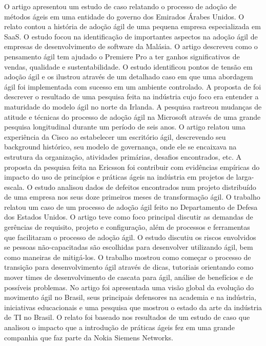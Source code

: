 O artigo \cite{Hajjdiab2011} apresentou um estudo de caso relatando o processo de adoção de métodos ágeis em uma entidade do governo dos Emirados Árabes Unidos. O relato \cite{Block2011} contou a história de adoção ágil de uma pequena empresa especializada em SaaS. O estudo \cite{Asnawi2012} focou na identificação de importantes aspectos na adoção ágil de empresas de desenvolvimento de software da Malásia. O artigo \cite{Adobe2012} descreveu como o pensamento ágil tem ajudado o Premiere Pro a ter ganhos significativos de vendas, qualidade e sustentabilidade. O estudo \cite{Fitzgerald2013} identificou pontos de tensão em adoção ágil e os ilustrou através de um detalhado caso em que uma abordagem ágil foi implementada com sucesso em um ambiente controlado. A proposta de \cite{Bustard2013} foi descrever o resultado de uma pesquisa feita na indústria cujo foco era entender a maturidade do modelo ágil no norte da Irlanda. A pesquisa \cite{Microsoft2013} rastreou mudanças de atitude e técnicas do processo de adoção ágil na Microsoft através de uma grande pesquisa longitudinal durante um período de seis anos. O artigo \cite{Cisco2011} relatou uma experiência da Cisco ao estabelecer um escritório ágil, descrevendo seu background histórico, seu modelo de governança, onde ele se encaixava na estrutura da organização, atividades primárias, desafios encontrados, etc. A proposta da pesquisa \cite{Ericsson2013} feita na Ericsson foi contribuir com evidências empíricas do impacto do uso de princípios e práticas ágeis na indústria em projetos de larga-escala. O estudo \cite{Korhonen2010} analisou dados de defeitos encontrados num projeto distribuído de uma empresa nos seus doze primeiros meses de transformação ágil. O trabalho \cite{Lapham2012} relatou um caso de um processo de adoção ágil feito no Departamento de Defesa dos Estados Unidos. O artigo \cite{Arikpo2011} teve como foco principal discutir as demandas de gerências de requisito, projeto e configuração, além de processos e ferramentas que facilitaram o processo de adoção ágil. O estudo \cite{Radha2012} discutiu os riscos envolvidos se pessoas não-capacitadas são escolhidas para desenvolver utilizando ágil, bem como maneiras de mitigá-los. O trabalho \cite{Eunha2012} mostrou como começar o processo de transição para desenvolvimento ágil através de dicas, tutoriais orientando como mover times de desenvolvimento de cascata para ágil, análise de benefícios e de possíveis problemas. No artigo \cite{Claudia2013} foi apresentada uma visão global da evolução do movimento ágil no Brasil, seus principais defensores na academia e na indústria, iniciativas educacionais e uma pesquisa que mostrou o estado da arte da indústria de TI no Brasil. O relato \cite{Nokia2013} foi baseado nos resultados de um estudo de caso que analisou o impacto que a introdução de práticas ágeis fez em uma grande companhia que faz parte da Nokia Siemens Networks.

